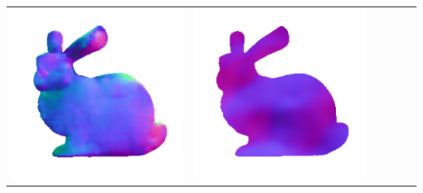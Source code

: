 \begin{center}
\begin{tabularx}{\linewidth}{@{}Y@{}Y@{}Y@{}Y@{}Y@{}Y@{}}
\includegraphics[width=\linewidth]{semisynthetic/20150514_14_marrnet_out.png} &
\includegraphics[width=\linewidth]{semisynthetic/20150514_14_ef_out.png} \\

\end{tabularx}
\end{center}
